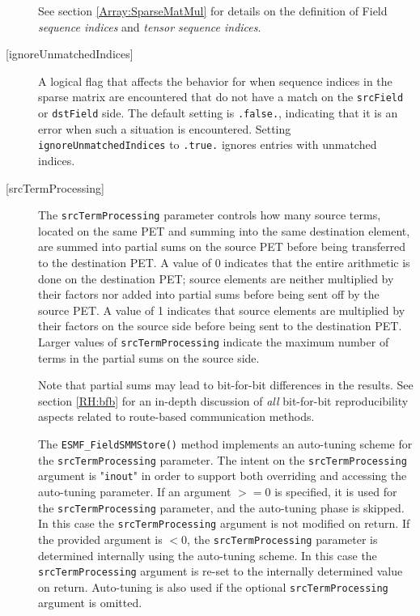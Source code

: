\begin{description}
       See section \ref{Array:SparseMatMul} for details on the definition of 
       Field {\em sequence indices} and {\em tensor sequence indices}.
  
     \item [{[ignoreUnmatchedIndices]}]
       A logical flag that affects the behavior for when sequence indices 
       in the sparse matrix are encountered that do not have a match on the 
       {\tt srcField} or {\tt dstField} side. The default setting is 
       {\tt .false.}, indicating that it is an error when such a situation is 
       encountered. Setting {\tt ignoreUnmatchedIndices} to {\tt .true.} ignores
       entries with unmatched indices.
  
     \item [{[srcTermProcessing]}]
       The {\tt srcTermProcessing} parameter controls how many source terms,
       located on the same PET and summing into the same destination element,
       are summed into partial sums on the source PET before being transferred
       to the destination PET. A value of 0 indicates that the entire arithmetic
       is done on the destination PET; source elements are neither multiplied
       by their factors nor added into partial sums before being sent off by the
       source PET. A value of 1 indicates that source elements are multiplied
       by their factors on the source side before being sent to the destination
       PET. Larger values of {\tt srcTermProcessing} indicate the maximum number
       of terms in the partial sums on the source side.
  
       Note that partial sums may lead to bit-for-bit differences in the results.
       See section \ref{RH:bfb} for an in-depth discussion of {\em all}
       bit-for-bit reproducibility aspects related to route-based communication
       methods.
  
       \begin{sloppypar}
       The {\tt ESMF\_FieldSMMStore()} method implements an auto-tuning scheme
       for the {\tt srcTermProcessing} parameter. The intent on the
       {\tt srcTermProcessing} argument is "{\tt inout}" in order to
       support both overriding and accessing the auto-tuning parameter.
       If an argument $>= 0$ is specified, it is used for the
       {\tt srcTermProcessing} parameter, and the auto-tuning phase is skipped.
       In this case the {\tt srcTermProcessing} argument is not modified on
       return. If the provided argument is $< 0$, the {\tt srcTermProcessing}
       parameter is determined internally using the auto-tuning scheme. In this
       case the {\tt srcTermProcessing} argument is re-set to the internally
       determined value on return. Auto-tuning is also used if the optional
       {\tt srcTermProcessing} argument is omitted.
       \end{sloppypar}
  

\end{description}
